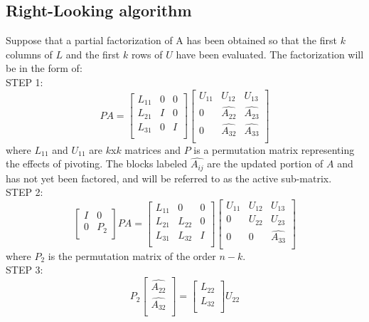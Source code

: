 \subsection{Right-Looking algorithm}
Suppose that a partial factorization of A has been obtained so that the first $k$ columns of $L$ and the first $k$ rows of $U$ have been evaluated. The
factorization will be in the form of:\\
STEP 1:
\begin{equation}  
PA=
\left[\begin{array}{lll}
L_{11} & 0 & 0\\
L_{21} & I & 0\\
L_{31} & 0 & I\\
\end{array}\right]
\left[\begin{array}{lll}
U_{11} & U_{12} & U_{13}\\
0 & \hat{A_{22}} & \hat{A_{23}}\\
0 & \hat{A_{32}} & \hat{A_{33}}\\
\end{array}\right]
\end{equation}
where $L_{11}$ and $U_{11}$ are $k$x$k$ matrices and $P$ is a permutation matrix representing the effects of pivoting. The blocks labeled $\hat{A_{ij}}$ are
the updated portion of $A$ and has not yet been factored, and will be referred to as the active sub-matrix.\\
STEP 2:
\begin{equation}  
\left[\begin{array}{ll}
 I  & 0 \\
 0  & P_{2}\\
\end{array}\right] PA=
\left[\begin{array}{lll}
L_{11} & 0 & 0\\
L_{21} & L_{22} & 0\\
L_{31} & L_{32} & I\\
\end{array}\right]
\left[\begin{array}{lll}
U_{11} & U_{12} & U_{13}\\
0 & U_{22} & U_{23}\\
0 & 0 & \hat{A_{33}}\\
\end{array}\right]
\end{equation}
where $P_{2}$ is the permutation matrix of the order $n-k$.\\
STEP 3:
\begin{equation}
P_{2}
\left[\begin{array}{l}
 \hat{A_{22}}\\
 \hat{A_{32}}\\     
\end{array}\right]=
\left[\begin{array}{l}  
L_{22}\\
L_{32}\\ 
\end{array}\right]U_{22}
\end{equation}
